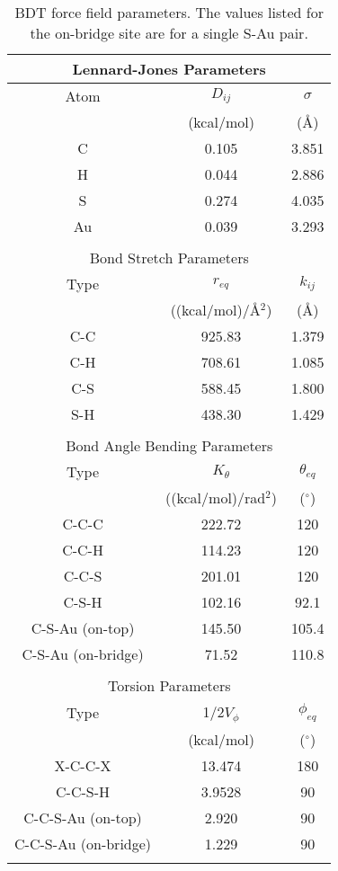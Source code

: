 \documentclass[10pt]{report}  %
\newcommand{\T}{\rule{0pt}{2.6ex}}
\newcommand{\B}{\rule[-1.2ex]{0pt}{0pt}}
\newcommand{\degree}{\ensuremath{^\circ}}
\begin{document}
%
%
\begin{table} []
\caption{BDT force field parameters. The values listed for the on-bridge site are for a single S-Au pair.}
\centering
\begin{tabular}{ c  c  c }
\multicolumn{3}{c}{Lennard-Jones Parameters} \\
    \hline 
Atom \T \B & $D_{ij}$ & $\sigma$ \\
 \T \B & (kcal/mol) & (\AA) \\
    \hline 
C \T \B & 0.105 & 3.851 \\
H \T \B & 0.044 & 2.886 \\
S \T \B & 0.274 & 4.035 \\
Au \T \B & 0.039 & 3.293 \\ 
     \hline \\
	
\multicolumn{3}{c}{Bond Stretch Parameters} \\
	\hline
Type \T \B & $r_{eq}$ & $k_{ij}$  \\
 \T \B & ((kcal/mol)/\AA$^2$) & (\AA)  \\
	\hline
C-C \T \B & 925.83 & 1.379   \\
C-H \T \B & 708.61 & 1.085   \\
C-S \T \B & 588.45 & 1.800    \\
S-H \T \B & 438.30 & 1.429    \\
	\hline \\ 
	
\multicolumn{3}{c}{Bond Angle Bending Parameters } \\
	\hline
Type \T \B & $K_{\theta}$ & $\theta_{eq}$ \\
 \T \B & ((kcal/mol)/rad$^2$) & (\degree)  \\
	\hline
C-C-C \T \B & 222.72 & 120  \\
C-C-H \T \B & 114.23 & 120  \\
C-C-S \T \B & 201.01 & 120  \\
C-S-H \T \B & 102.16 & 92.1 \\
C-S-Au (on-top) \T \B & 145.50 & 105.4 \\
C-S-Au (on-bridge) \T \B & 71.52 & 110.8 \\
	\hline \\ 
	
\multicolumn{3}{c}{Torsion Parameters } \\
	\hline
Type \T \B & 1/2$V_{\phi}$ & $\phi_{eq}$ \\
 \T \B & (kcal/mol) & (\degree) \\
	\hline
X-C-C-X \T \B & 13.474 & 180 \\
C-C-S-H \T \B & 3.9528 & 90 \\
C-C-S-Au (on-top) \T \B & 2.920 & 90 \\
C-C-S-Au (on-bridge) \T \B & 1.229 & 90 \\
	\hline \\ 


\end{tabular}
\end{table}
\end{document}
